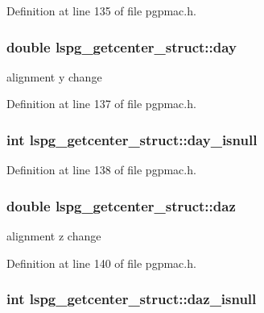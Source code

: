 Definition at line 135 of file pgpmac.h.\hypertarget{structlspg__getcenter__struct_a9ce0f29540f2ff47be9788565d19f1b8}{
\subsubsection[{day}]{\setlength{\rightskip}{0pt plus 5cm}double {\bf lspg\_\-getcenter\_\-struct::day}}}
\label{structlspg__getcenter__struct_a9ce0f29540f2ff47be9788565d19f1b8}


alignment y change 

Definition at line 137 of file pgpmac.h.\hypertarget{structlspg__getcenter__struct_a36f57a319288810caf365cca7827ff96}{
\subsubsection[{day\_\-isnull}]{\setlength{\rightskip}{0pt plus 5cm}int {\bf lspg\_\-getcenter\_\-struct::day\_\-isnull}}}
\label{structlspg__getcenter__struct_a36f57a319288810caf365cca7827ff96}


Definition at line 138 of file pgpmac.h.\hypertarget{structlspg__getcenter__struct_a1170bab2161f03ab29c39f79519ed9ae}{
\subsubsection[{daz}]{\setlength{\rightskip}{0pt plus 5cm}double {\bf lspg\_\-getcenter\_\-struct::daz}}}
\label{structlspg__getcenter__struct_a1170bab2161f03ab29c39f79519ed9ae}


alignment z change 

Definition at line 140 of file pgpmac.h.\hypertarget{structlspg__getcenter__struct_a36742b6bd0f4bf9356414930ba893617}{
\subsubsection[{daz\_\-isnull}]{\setlength{\rightskip}{0pt plus 5cm}int {\bf lspg\_\-getcenter\_\-struct::daz\_\-isnull}}}
\label{structlspg__getcenter__struct_a36742b6bd0f4bf9356414930ba893617}


